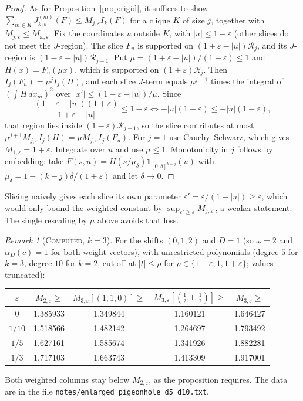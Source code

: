 \documentclass[11pt]{amsart}
\theoremstyle{definition}
\theoremstyle{remark}
\newtheorem{remark}[theorem]{Remark}
\newcommand{\lbl}[1]{\textup{\textsc{#1}}}
\newcommand{\R}{\mathcal{R}}
\begin{document}
\begin{proof}
As for Proposition~\ref{prop:rigid}, it suffices to show
$\sum_{m\in K}J_{k,\varepsilon}^{(m)}(F)\le M_{j,\varepsilon}I_k(F)$ for a
clique $K$ of size $j$, together with $M_{j,\varepsilon}\le M_{\omega,\varepsilon}$.
Fix the coordinates $u$ outside $K$, with $|u|\le1-\varepsilon$ (other slices
do not meet the $J$-region). The slice $F_u$ is supported on
$(1+\varepsilon-|u|)\R_j$, and its $J$-region is
$(1-\varepsilon-|u|)\R_{j-1}$. Put $\mu=(1+\varepsilon-|u|)/(1+\varepsilon)\le1$
and $H(x)=F_u(\mu x)$, which is supported on $(1+\varepsilon)\R_j$. Then
$I_j(F_u)=\mu^jI_j(H)$, and each slice $J$-term equals $\mu^{j+1}$ times the
integral of $(\int H\,dx_m)^2$ over $|x'|\le(1-\varepsilon-|u|)/\mu$. Since
\[
\frac{(1-\varepsilon-|u|)(1+\varepsilon)}{1+\varepsilon-|u|}\le1-\varepsilon
\iff -|u|(1+\varepsilon)\le-|u|(1-\varepsilon),
\]
that region lies inside $(1-\varepsilon)\R_{j-1}$, so the slice contributes at
most $\mu^{j+1}M_{j,\varepsilon}I_j(H)=\mu M_{j,\varepsilon}I_j(F_u)$. For
$j=1$ use Cauchy--Schwarz, which gives $M_{1,\varepsilon}=1+\varepsilon$.
Integrate over $u$ and use $\mu\le1$. Monotonicity in $j$ follows by
embedding: take $F(s,u)=H(s/\mu_\delta)\mathbf 1_{[0,\delta]^{k-j}}(u)$ with
$\mu_\delta=1-(k-j)\delta/(1+\varepsilon)$ and let $\delta\to0$.
\end{proof}

Slicing naively gives each slice its own parameter
$\varepsilon'=\varepsilon/(1-|u|)\ge\varepsilon$, which would only bound the
weighted constant by $\sup_{\varepsilon'\ge\varepsilon}M_{j,\varepsilon'}$, a
weaker statement. The single rescaling by $\mu$ above avoids that loss.

\begin{remark}[\lbl{Computed}, $k=3$]
For the shifts $(0,1,2)$ and $D=1$ (so $\omega=2$ and $\alpha_D(c)=1$ for
both weight vectors), with unrestricted polynomials (degree $5$ for $k=3$,
degree $10$ for $k=2$, cut off at $|t|\le\rho$ for
$\rho\in\{1-\varepsilon,1,1+\varepsilon\}$; values truncated):
\begin{center}
\begin{tabular}{@{}ccccc@{}}
\toprule
$\varepsilon$ & $M_{2,\varepsilon}\ge$ & $M_{3,\varepsilon}[(1,1,0)]\ge$ & $M_{3,\varepsilon}[(\frac12,1,\frac12)]\ge$ & $M_{3,\varepsilon}\ge$\\
\midrule
$0$ & 1.385933 & 1.349844 & 1.160121 & 1.646427\\
$1/10$ & 1.518566 & 1.482142 & 1.264697 & 1.793492\\
$1/5$ & 1.627161 & 1.585674 & 1.341926 & 1.882281\\
$1/3$ & 1.717103 & 1.663743 & 1.413309 & 1.917001\\
\bottomrule
\end{tabular}
\end{center}
Both weighted columns stay below $M_{2,\varepsilon}$, as the proposition
requires. The data are in the file
\texttt{notes/}\allowbreak\texttt{enlarged\_pigeonhole\_}\allowbreak\texttt{d5\_d10.txt}.
\end{remark}
\end{document}
